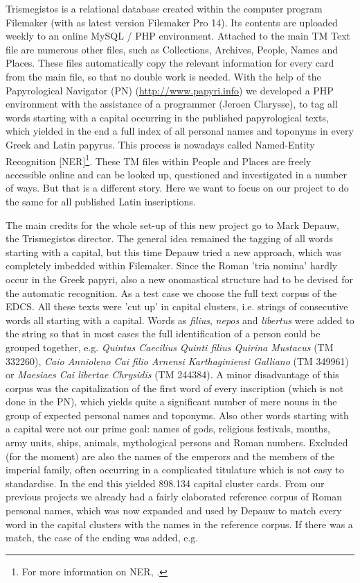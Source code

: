 \documentclass[amsthm,ebook]{saparticle}
\begin{document}
 Trismegistos is a relational database created within the computer program Filemaker (with as latest version
Filemaker Pro 14). Its contents are uploaded weekly to an online MySQL / PHP environment. Attached to the main TM Text
file are numerous other files, such as Collections, Archives, People, Names and Places. These files automatically copy
the relevant information for every card from the main file, so that no double work is needed. With the help of the
Papyrological Navigator (PN) (\url{http://www.papyri.info}) we developed a PHP environment with the assistance of a
programmer (Jeroen Clarysse), to tag all words starting with a capital occurring in the published papyrological texts,
which yielded in the end a full index of all personal names and toponyms in every Greek and Latin papyrus. This process
is nowadays called Named-Entity Recognition [NER]\footnote{ For more information on NER, \citet[304-313]{BrouxDepauw2}.}. These
TM files within People and Places are freely accessible online and can be looked up, questioned and investigated in a
number of ways. But that is a different story. Here we want to focus on our project to do the same for all published
Latin inscriptions.


 The main credits for the whole set-up of this new project go to Mark Depauw, the Trismegistos director. The general
idea remained the tagging of all words starting with a capital, but this time Depauw tried a new approach, which was
completely imbedded within Filemaker. Since the Roman 'tria nomina' hardly occur in the Greek papyri, also a new
onomastical structure had to be devised for the automatic recognition. As a test case we choose the full text corpus of
the EDCS. All these texts were 'cut up' in capital clusters, i.e. strings of consecutive words all starting with a
capital. Words as \emph{filius}, \emph{nepos} and \emph{libertus} were added to the string so that in most cases the full identification of
a person could be grouped together, e.g. \emph{Quintus Caecilius Quinti filius Quirina Mustacus} (TM 332260), \emph{Caio Annioleno
Cai filio Arnensi Karthaginiensi Galliano} (TM 349961) or \emph{Maesiaes Cai libertae Chrysidis} (TM 244384). A minor
disadvantage of this corpus was the capitalization of the first word of every inscription (which is not done in the
PN), which yields quite a significant number of mere nouns in the group of expected personal names and toponyms. Also
other words starting with a capital were not our prime goal: names of gods, religious festivals, months, army units,
ships, animals, mythological persons and Roman numbers. Excluded (for the moment) are also the names of the emperors
and the members of the imperial family, often occurring in a complicated titulature which is not easy to standardise.
In the end this yielded 898.134 capital cluster cards. From our previous projects we already had a fairly elaborated
reference corpus of Roman personal names, which was now expanded and used by Depauw to match every word in the capital
clusters with the names in the reference corpus. If there was a match, the case of the ending was added, e.g.
\end{document}
